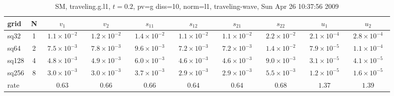 \begin{table}[hbt]\tableFont %
\begin{center}
\begin{tabular}{|l|c|c|c|c|c|c|c|c|c|} \hline\hline 
grid  & N  & $v_1$ & $v_2$ & $s_{11}$ & $s_{12}$ & $s_{21}$ & $s_{22}$ &  $u_1$ & $u_2$\\ \hline 
                sq32 &     1 & ~$1.1\times10^{ -2}$~ & ~$1.2\times10^{ -2}$~ & ~$1.4\times10^{ -2}$~ & ~$1.1\times10^{ -2}$~ & ~$1.1\times10^{ -2}$~ & ~$2.2\times10^{ -2}$~ & ~$2.1\times10^{ -4}$~ & ~$2.8\times10^{ -4}$~  \\ \hline
                sq64 &     2 & ~$7.5\times10^{ -3}$~ & ~$7.8\times10^{ -3}$~ & ~$9.6\times10^{ -3}$~ & ~$7.2\times10^{ -3}$~ & ~$7.2\times10^{ -3}$~ & ~$1.4\times10^{ -2}$~ & ~$7.9\times10^{ -5}$~ & ~$1.1\times10^{ -4}$~  \\ \hline
               sq128 &     4 & ~$4.8\times10^{ -3}$~ & ~$4.9\times10^{ -3}$~ & ~$6.0\times10^{ -3}$~ & ~$4.6\times10^{ -3}$~ & ~$4.6\times10^{ -3}$~ & ~$9.0\times10^{ -3}$~ & ~$3.1\times10^{ -5}$~ & ~$4.1\times10^{ -5}$~  \\ \hline
               sq256 &     8 & ~$3.0\times10^{ -3}$~ & ~$3.0\times10^{ -3}$~ & ~$3.7\times10^{ -3}$~ & ~$2.9\times10^{ -3}$~ & ~$2.9\times10^{ -3}$~ & ~$5.5\times10^{ -3}$~ & ~$1.2\times10^{ -5}$~ & ~$1.6\times10^{ -5}$~  \\ \hline
    rate             &       &       $0.63$          &       $0.66$          &       $0.66$          &       $0.64$          &       $0.64$          &       $0.68$          &       $1.37$          &       $1.39$           \\ \hline\hline
\end{tabular}
\caption{SM, traveling.g.l1, $t=0.2$,  pv=g diss=10, norm=l1, traveling-wave, Sun Apr 26 10:37:56 2009}\label{table:traveling.g.l1}
\end{center}
\end{table}
